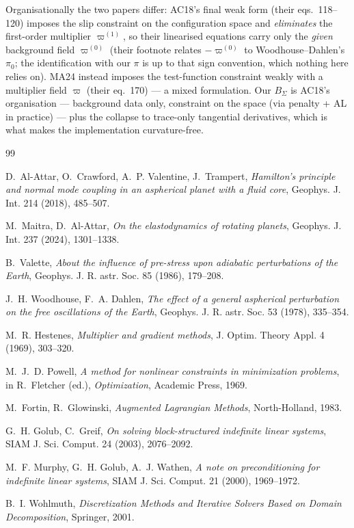 \documentclass[11pt]{article}
\begin{document}
Organisationally the two papers differ: AC18's final weak form
(their eqs.~118--120) imposes the slip constraint on the configuration
space and \emph{eliminates} the first-order multiplier
$\varpi^{(1)}$, so their linearised equations carry only the
\emph{given} background field $\varpi^{(0)}$ (their footnote relates
$-\varpi^{(0)}$ to Woodhouse--Dahlen's $\pi_0$; the identification
with our $\pi$ is up to that sign convention, which nothing here
relies on). MA24 instead imposes the test-function constraint weakly
with a multiplier field $\varpi$ (their eq.~170) --- a mixed
formulation. Our $B_\Sigma$ is AC18's organisation --- background
data only, constraint on the space (via penalty + AL in practice) ---
plus the collapse to trace-only tangential derivatives, which is what
makes the implementation curvature-free.

\begin{thebibliography}{99}

D.~Al-Attar, O.~Crawford, A.~P. Valentine, J.~Trampert,
\emph{Hamilton's principle and normal mode coupling in an aspherical
planet with a fluid core},
Geophys. J. Int. 214 (2018), 485--507.

M.~Maitra, D.~Al-Attar,
\emph{On the elastodynamics of rotating planets},
Geophys. J. Int. 237 (2024), 1301--1338.

B.~Valette,
\emph{About the influence of pre-stress upon adiabatic perturbations of
the Earth},
Geophys. J. R. astr. Soc. 85 (1986), 179--208.

J.~H. Woodhouse, F.~A. Dahlen,
\emph{The effect of a general aspherical perturbation on the free
oscillations of the Earth},
Geophys. J. R. astr. Soc. 53 (1978), 335--354.

M.~R. Hestenes,
\emph{Multiplier and gradient methods},
J. Optim. Theory Appl. 4 (1969), 303--320.

M.~J.~D. Powell,
\emph{A method for nonlinear constraints in minimization problems},
in R.~Fletcher (ed.), \emph{Optimization}, Academic Press, 1969.

M.~Fortin, R.~Glowinski,
\emph{Augmented Lagrangian Methods},
North-Holland, 1983.

G.~H. Golub, C.~Greif,
\emph{On solving block-structured indefinite linear systems},
SIAM J. Sci. Comput. 24 (2003), 2076--2092.

M.~F. Murphy, G.~H. Golub, A.~J. Wathen,
\emph{A note on preconditioning for indefinite linear systems},
SIAM J. Sci. Comput. 21 (2000), 1969--1972.

B.~I. Wohlmuth,
\emph{Discretization Methods and Iterative Solvers Based on Domain
Decomposition},
Springer, 2001.

\end{thebibliography}
\end{document}
